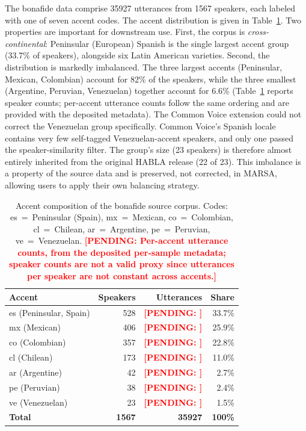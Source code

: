 \documentclass[11pt]{article}
\newcommand{\PENDING}[1]{\textcolor{red}{\textbf{[PENDING: #1]}}}
\begin{document}
The bonafide data comprise 35927 utterances from 1567 speakers,
each labeled with one of seven accent codes. The accent distribution is
given in Table~\ref{tab:accents}. Two properties are important for
downstream use. First, the corpus is \emph{cross-continental}:
Peninsular (European) Spanish is the single largest accent group
(33.7\% of speakers), alongside six Latin American varieties. Second,
the distribution is markedly imbalanced. The three largest accents
(Peninsular, Mexican, Colombian) account for 82\% of the speakers, while
the three smallest (Argentine, Peruvian, Venezuelan) together account
for 6.6\% (Table~\ref{tab:accents} reports speaker counts; per-accent
utterance counts follow the same ordering and are provided with the
deposited metadata). The Common Voice extension could not correct the
Venezuelan group specifically. Common Voice's Spanish locale contains
very few self-tagged Venezuelan-accent speakers, and only one passed the
speaker-similarity filter. The group's size (23 speakers) is therefore
almost entirely inherited from the original HABLA release (22 of 23).
This imbalance is a property of the source data and is preserved, not
corrected, in MARSA, allowing users to apply their own balancing
strategy.

\begin{table}[t]
\centering
\caption{Accent composition of the bonafide source corpus. Codes: es~=~Peninsular
(Spain), mx~=~Mexican, co~=~Colombian, cl~=~Chilean, ar~=~Argentine,
pe~=~Peruvian, ve~=~Venezuelan. \PENDING{Per-accent utterance counts,
from the deposited per-sample metadata; speaker counts are not a valid
proxy since utterances per speaker are not constant across accents.}}
\label{tab:accents}
\small
\begin{tabular}{lrrr}
\toprule
\textbf{Accent} & \textbf{Speakers} & \textbf{Utterances} & \textbf{Share} \\
\midrule
es (Peninsular, Spain) & 528 & \PENDING{} & 33.7\% \\
mx (Mexican)           & 406 & \PENDING{} & 25.9\% \\
co (Colombian)         & 357 & \PENDING{} & 22.8\% \\
cl (Chilean)           & 173 & \PENDING{} & 11.0\% \\
ar (Argentine)         & 42  & \PENDING{} & 2.7\% \\
pe (Peruvian)          & 38  & \PENDING{} & 2.4\% \\
ve (Venezuelan)        & 23  & \PENDING{} & 1.5\% \\
\midrule
\textbf{Total}         & \textbf{1567} & \textbf{35927} & \textbf{100\%} \\
\bottomrule
\end{tabular}
\end{table}
\end{document}
